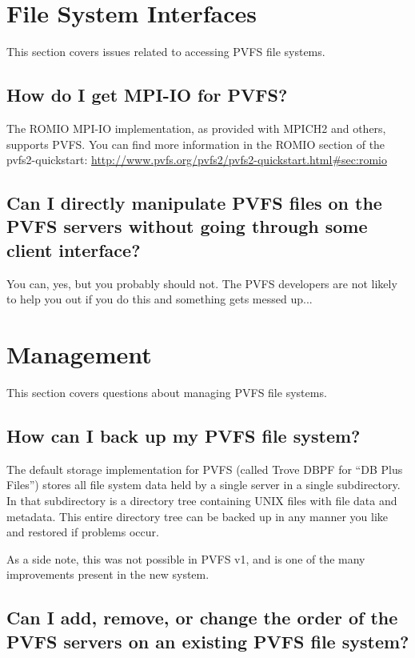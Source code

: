 \documentclass[11pt,letterpaper]{article}
\begin{document}
%
%
\section{File System Interfaces}

This section covers issues related to accessing PVFS file systems.

\subsection{How do I get MPI-IO for PVFS?}

The ROMIO MPI-IO implementation, as provided with MPICH2 and others, supports
PVFS.  You can find more information in the ROMIO section of the
pvfs2-quickstart: \url{http://www.pvfs.org/pvfs2/pvfs2-quickstart.html\#sec:romio}

\subsection{Can I directly manipulate PVFS files on the PVFS servers
            without going through some client interface?}

You can, yes, but you probably should not.  The PVFS developers are not
likely to help you out if you do this and something gets messed up...

%
%
\section{Management}

This section covers questions about managing PVFS file systems.

\subsection{How can I back up my PVFS file system?}

The default storage implementation for PVFS (called Trove DBPF for ``DB Plus
Files'') stores all file system data held by a single server in a single
subdirectory.  In that subdirectory is a directory tree containing UNIX files
with file data and metadata.
%
This entire directory tree can be backed up in any manner you like and
restored if problems occur.

As a side note, this was not possible in PVFS v1, and is one of the many
improvements present in the new system.

\subsection{Can I add, remove, or change the order of the PVFS servers
            on an existing PVFS file system?}
\end{document}
